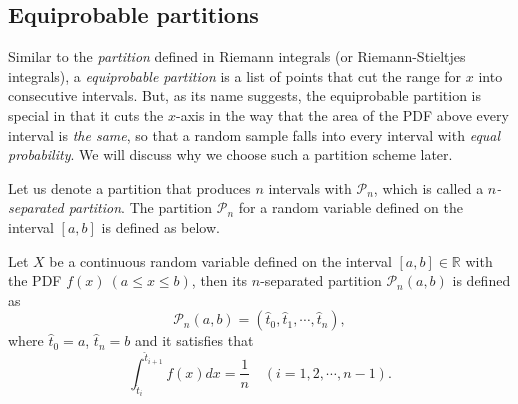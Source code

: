 \subsection{Equiprobable partitions}
Similar to the \textit{partition} defined in Riemann integrals (or Riemann-Stieltjes integrals), a \textit{equiprobable partition} is a list of points that cut the range for $ x $ into consecutive intervals. But, as its name suggests, the equiprobable partition is special in that it cuts the $ x $-axis in the way that the area of the PDF above every interval is \textit{the same}, so that a random sample falls into every interval with \textit{equal probability}. We will discuss why we choose such a partition scheme later.

Let us denote a partition that produces $ n $ intervals with $ \mathcal{P}_n $, which is called a \textit{$ n $-separated partition}.  The partition $ \mathcal{P}_n $ for a random variable defined on the interval $ [a,b] $ is defined as below.
\begin{defn}
Let $ X $ be a continuous random variable defined on the interval $ [a, b] \in \mathbb{R} $ with the PDF $ f(x)\ (a \leq x \leq b) $, then its $ n $-separated partition $ \mathcal{P}_n (a,b) $ is defined as 
\begin{equation}
\mathcal{P}_n (a,b) = (\hat{t}_0, \hat{t}_1, \cdots, \hat{t}_n),
\end{equation}
where $ \hat{t}_0 = a $, $ \hat{t}_n=b $ and it satisfies that 
\begin{equation}
\int_{\hat{t}_i}^{\hat{t}_{i+1}} f(x) dx = \frac{1}{n} \quad (i=1,2,\cdots, n-1).
\end{equation}
\end{defn}

